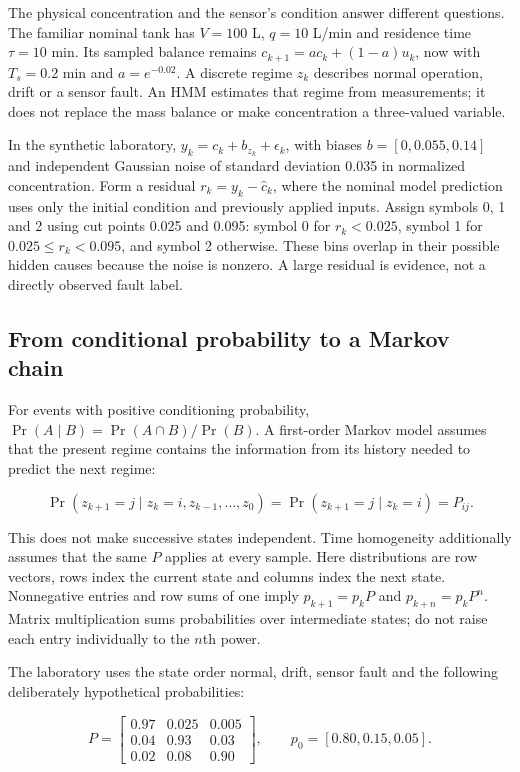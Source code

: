 \documentclass[11pt,a4paper]{article}
\begin{document}
The physical concentration and the sensor's condition answer different questions. The familiar nominal tank has $V=100$ L, $q=10$ L/min and residence time $\tau=10$ min. Its sampled balance remains $c_{k+1}=ac_k+(1-a)u_k$, now with $T_s=0.2$ min and $a=e^{-0.02}$. A discrete regime $z_k$ describes normal operation, drift or a sensor fault. An HMM estimates that regime from measurements; it does not replace the mass balance or make concentration a three-valued variable.


In the synthetic laboratory, $y_k=c_k+b_{z_k}+\epsilon_k$, with biases $b=[0,0.055,0.14]$ and independent Gaussian noise of standard deviation 0.035 in normalized concentration. Form a residual $r_k=y_k-\hat c_k$, where the nominal model prediction uses only the initial condition and previously applied inputs. Assign symbols 0, 1 and 2 using cut points 0.025 and 0.095: symbol 0 for $r_k<0.025$, symbol 1 for $0.025\leq r_k<0.095$, and symbol 2 otherwise. These bins overlap in their possible hidden causes because the noise is nonzero. A large residual is evidence, not a directly observed fault label.


\subsection{From conditional probability to a Markov chain}

For events with positive conditioning probability, $\Pr(A\mid B)=\Pr(A\cap B)/\Pr(B)$. A first-order Markov model assumes that the present regime contains the information from its history needed to predict the next regime:


\[\Pr(z_{k+1}=j\mid z_k=i,z_{k-1},\ldots,z_0)=\Pr(z_{k+1}=j\mid z_k=i)=P_{ij}.\]

This does not make successive states independent. Time homogeneity additionally assumes that the same $P$ applies at every sample. Here distributions are row vectors, rows index the current state and columns index the next state. Nonnegative entries and row sums of one imply $p_{k+1}=p_kP$ and $p_{k+n}=p_kP^n$. Matrix multiplication sums probabilities over intermediate states; do not raise each entry individually to the $n$th power.


The laboratory uses the state order normal, drift, sensor fault and the following deliberately hypothetical probabilities:


\[P=\begin{bmatrix}0.97&0.025&0.005\\0.04&0.93&0.03\\0.02&0.08&0.90\end{bmatrix},\qquad p_0=[0.80,0.15,0.05].\]
\end{document}
